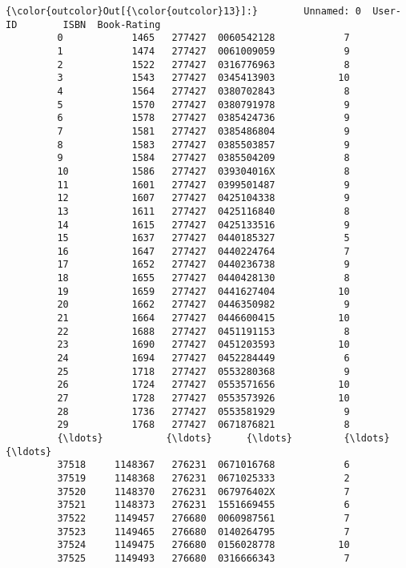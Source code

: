 \documentclass[11pt]{article}
\begin{document}
\begin{Verbatim}[commandchars=\\\{\}]
{\color{outcolor}Out[{\color{outcolor}13}]:}        Unnamed: 0  User-ID        ISBN  Book-Rating
         0            1465   277427  0060542128            7
         1            1474   277427  0061009059            9
         2            1522   277427  0316776963            8
         3            1543   277427  0345413903           10
         4            1564   277427  0380702843            8
         5            1570   277427  0380791978            9
         6            1578   277427  0385424736            9
         7            1581   277427  0385486804            9
         8            1583   277427  0385503857            9
         9            1584   277427  0385504209            8
         10           1586   277427  039304016X            8
         11           1601   277427  0399501487            9
         12           1607   277427  0425104338            9
         13           1611   277427  0425116840            8
         14           1615   277427  0425133516            9
         15           1637   277427  0440185327            5
         16           1647   277427  0440224764            7
         17           1652   277427  0440236738            9
         18           1655   277427  0440428130            8
         19           1659   277427  0441627404           10
         20           1662   277427  0446350982            9
         21           1664   277427  0446600415           10
         22           1688   277427  0451191153            8
         23           1690   277427  0451203593           10
         24           1694   277427  0452284449            6
         25           1718   277427  0553280368            9
         26           1724   277427  0553571656           10
         27           1728   277427  0553573926           10
         28           1736   277427  0553581929            9
         29           1768   277427  0671876821            8
         {\ldots}           {\ldots}      {\ldots}         {\ldots}          {\ldots}
         37518     1148367   276231  0671016768            6
         37519     1148368   276231  0671025333            2
         37520     1148370   276231  067976402X            7
         37521     1148373   276231  1551669455            6
         37522     1149457   276680  0060987561            7
         37523     1149465   276680  0140264795            7
         37524     1149475   276680  0156028778           10
         37525     1149493   276680  0316666343            7

\end{Verbatim}
\end{document}
